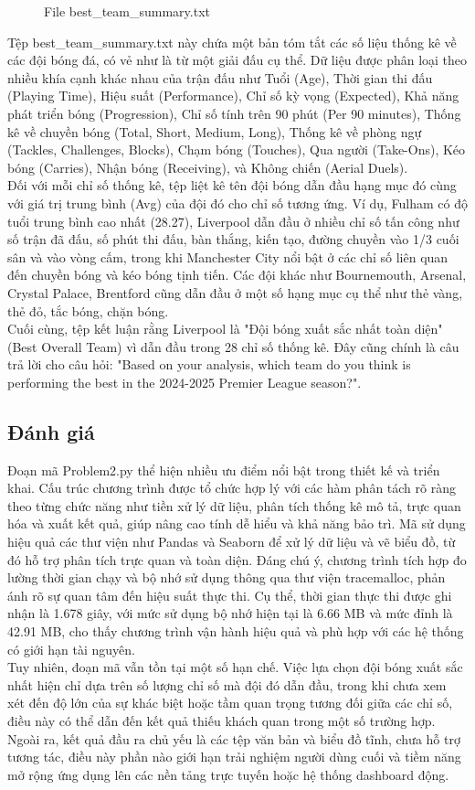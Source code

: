 \documentclass[12pt]{report}
\begin{document}
{\begin{figure}[h]
    \caption{File best\_team\_summary.txt}
    \label{fig:p8}
\end{figure}
Tệp best\_team\_summary.txt này chứa một bản tóm tắt các số liệu thống kê về các đội bóng đá, có vẻ như là từ một giải đấu cụ thể. Dữ liệu được phân loại theo nhiều khía cạnh khác nhau của trận đấu như Tuổi (Age), Thời gian thi đấu (Playing Time), Hiệu suất (Performance), Chỉ số kỳ vọng (Expected), Khả năng phát triển bóng (Progression), Chỉ số tính trên 90 phút (Per 90 minutes), Thống kê về chuyền bóng (Total, Short, Medium, Long), Thống kê về phòng ngự (Tackles, Challenges, Blocks), Chạm bóng (Touches), Qua người (Take-Ons), Kéo bóng (Carries), Nhận bóng (Receiving), và Không chiến (Aerial Duels).   
\\
Đối với mỗi chỉ số thống kê, tệp liệt kê tên đội bóng dẫn đầu hạng mục đó cùng với giá trị trung bình (Avg) của đội đó cho chỉ số tương ứng. Ví dụ, Fulham có độ tuổi trung bình cao nhất (28.27), Liverpool dẫn đầu ở nhiều chỉ số tấn công như số trận đã đấu, số phút thi đấu, bàn thắng, kiến tạo, đường chuyền vào 1/3 cuối sân và vào vòng cấm, trong khi Manchester City nổi bật ở các chỉ số liên quan đến chuyền bóng và kéo bóng tịnh tiến. Các đội khác như Bournemouth, Arsenal, Crystal Palace, Brentford cũng dẫn đầu ở một số hạng mục cụ thể như thẻ vàng, thẻ đỏ, tắc bóng, chặn bóng.   
\\
Cuối cùng, tệp kết luận rằng Liverpool là "Đội bóng xuất sắc nhất toàn diện" (Best Overall Team) vì dẫn đầu trong 28 chỉ số thống kê. Đây cũng chính là câu trả lời cho câu hỏi: "Based on your analysis, which team do you think is performing the best in the 2024-2025 Premier League season?".

\subsection{Đánh giá}
Đoạn mã Problem2.py thể hiện nhiều ưu điểm nổi bật trong thiết kế và triển khai. Cấu trúc chương trình được tổ chức hợp lý với các hàm phân tách rõ ràng theo từng chức năng như tiền xử lý dữ liệu, phân tích thống kê mô tả, trực quan hóa và xuất kết quả, giúp nâng cao tính dễ hiểu và khả năng bảo trì. Mã sử dụng hiệu quả các thư viện như Pandas và Seaborn để xử lý dữ liệu và vẽ biểu đồ, từ đó hỗ trợ phân tích trực quan và toàn diện. Đáng chú ý, chương trình tích hợp đo lường thời gian chạy và bộ nhớ sử dụng thông qua thư viện tracemalloc, phản ánh rõ sự quan tâm đến hiệu suất thực thi. Cụ thể, thời gian thực thi được ghi nhận là 1.678 giây, với mức sử dụng bộ nhớ hiện tại là 6.66 MB và mức đỉnh là 42.91 MB, cho thấy chương trình vận hành hiệu quả và phù hợp với các hệ thống có giới hạn tài nguyên.
\\
Tuy nhiên, đoạn mã vẫn tồn tại một số hạn chế. Việc lựa chọn đội bóng xuất sắc nhất hiện chỉ dựa trên số lượng chỉ số mà đội đó dẫn đầu, trong khi chưa xem xét đến độ lớn của sự khác biệt hoặc tầm quan trọng tương đối giữa các chỉ số, điều này có thể dẫn đến kết quả thiếu khách quan trong một số trường hợp. Ngoài ra, kết quả đầu ra chủ yếu là các tệp văn bản và biểu đồ tĩnh, chưa hỗ trợ tương tác, điều này phần nào giới hạn trải nghiệm người dùng cuối và tiềm năng mở rộng ứng dụng lên các nền tảng trực tuyến hoặc hệ thống dashboard động.
}
\end{document}
